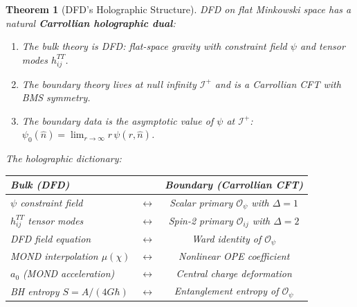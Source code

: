 \documentclass[11pt,a4paper]{article}
\newtheorem{theorem}{Theorem}
\begin{document}
\begin{theorem}[DFD's Holographic Structure]
\label{thm:holography}
DFD on flat Minkowski space has a natural \textbf{Carrollian holographic dual}:
\begin{enumerate}
\item The bulk theory is DFD: flat-space gravity with constraint field $\psi$ and tensor modes $h_{ij}^{TT}$.
\item The boundary theory lives at null infinity $\mathscr{I}^+$ and is a Carrollian CFT with BMS symmetry.
\item The boundary data is the asymptotic value of $\psi$ at $\mathscr{I}^+$: $\psi_0(\hat{n}) = \lim_{r\to\infty} r\,\psi(r,\hat{n})$.
\end{enumerate}

The holographic dictionary:
\begin{center}
\begin{tabular}{lcc}
\toprule
\textbf{Bulk (DFD)} & & \textbf{Boundary (Carrollian CFT)} \\
\midrule
$\psi$ constraint field & $\leftrightarrow$ & Scalar primary $\mathcal{O}_\psi$ with $\Delta = 1$ \\
$h_{ij}^{TT}$ tensor modes & $\leftrightarrow$ & Spin-2 primary $\mathcal{O}_{ij}$ with $\Delta = 2$ \\
DFD field equation & $\leftrightarrow$ & Ward identity of $\mathcal{O}_\psi$ \\
MOND interpolation $\mu(\chi)$ & $\leftrightarrow$ & Nonlinear OPE coefficient \\
$a_0$ (MOND acceleration) & $\leftrightarrow$ & Central charge deformation \\
BH entropy $S = A/(4G\hbar)$ & $\leftrightarrow$ & Entanglement entropy of $\mathcal{O}_\psi$ \\
\bottomrule
\end{tabular}
\end{center}
\end{theorem}
\end{document}

